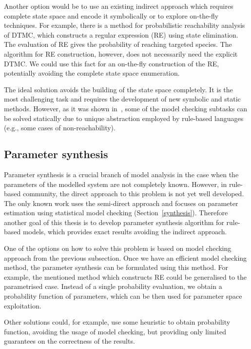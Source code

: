 \documentclass[11pt,a4paper]{report}
\begin{document}
Another option would be to use an existing indirect approach which requires complete state space and encode it symbolically or to explore on-the-fly techniques. For example, there is a method for probabilistic reachability analysis of DTMC, which constructs a regular expression (RE) using state elimination. The evaluation of RE gives the probability of reaching targeted species. The algorithm for RE construction, however, does not necessarily need the explicit DTMC. We could use this fact for an on-the-fly construction of the RE, potentially avoiding the complete state space enumeration.

The ideal solution avoids the building of the state space completely. It is the most challenging task and requires the development of new symbolic and static methods. However, as it was shown in~\cite{trojak2018sasb}, some of the model checking subtasks can be solved statically due to unique abstraction employed by rule-based languages (e.g., some cases of non-reachability).

\subsection{Parameter synthesis}

Parameter synthesis is a crucial branch of model analysis in the case when the parameters of the modelled system are not completely known. However, in rule-based community, the direct approach to this problem is not yet well developed. The only known work uses the semi-direct approach and focuses on parameter estimation using statistical model checking (Section~\ref{synthesis}). Therefore another goal of this thesis is to develop parameter synthesis algorithm for rule-based models, which provides exact results avoiding the indirect approach.

One of the options on how to solve this problem is based on model checking approach from the previous subsection. Once we have an efficient model checking method, the parameter synthesis can be formulated using this method. For example, the mentioned method which constructs RE could be generalised to the parametrised case. Instead of a single probability evaluation, we obtain a probability function of parameters, which can be then used for parameter space exploitation. 

Other solutions could, for example, use some heuristic to obtain probability function, avoiding the usage of model checking, but providing only limited guarantees on the correctness of the results.
\end{document}
